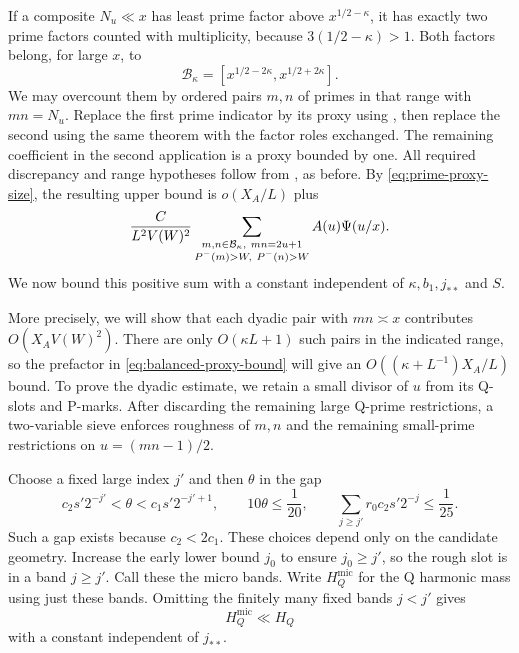 If a composite $N_u\ll x$ has least prime factor above
$x^{1/2-\kappa}$, it has exactly two prime factors counted with
multiplicity, because $3(1/2-\kappa)>1$. Both factors belong,
for large $x$, to
\[
 \mathcal B_\kappa=[x^{1/2-2\kappa},x^{1/2+2\kappa}].
\]
We may overcount them by ordered pairs $m,n$ of primes in that
range with $mn=N_u$. Replace the first prime indicator by its
proxy using , then replace the second using the
same theorem with the factor roles exchanged. The remaining
coefficient in the second application is a proxy bounded by one.
All required discrepancy and range hypotheses follow from
, as before. By
\eqref{eq:prime-proxy-size}, the resulting upper bound is
$o(X_A/L)$ plus
\begin{equation}\label{eq:balanced-proxy-bound}
 \frac{C}{L^2V(W)^2}
 \sum_{\substack{m,n\in\mathcal B_\kappa,\ mn=2u+1\\
                   P^{-}(m)>W,\ P^{-}(n)>W}}
                     A(u)\Psi(u/x).
\end{equation}
We now bound this positive sum with a constant independent of
$\kappa,b_1,j_{**}$ and $S$.

More precisely, we will show that each dyadic pair with $mn\asymp x$
contributes $O(X_AV(W)^2)$. There are only $O(\kappa L+1)$ such
pairs in the indicated range, so the prefactor in
\eqref{eq:balanced-proxy-bound} will give an
$O((\kappa+L^{-1})X_A/L)$ bound. To prove the dyadic estimate, we
retain a small divisor of $u$ from its Q-slots and P-marks. After
discarding the remaining large Q-prime restrictions, a two-variable
sieve enforces roughness of $m,n$ and the remaining small-prime
restrictions on $u=(mn-1)/2$.

Choose a fixed large index $j'$ and then $\theta$ in the gap
\begin{equation}\label{eq:micro-choice}
 c_2s'2^{-j'}<\theta<c_1s'2^{-j'+1},\qquad
 10\theta\le\frac1{20},\qquad
 \sum_{j\ge j'}r_0c_2s'2^{-j}\le\frac1{25}.
\end{equation}
Such a gap exists because $c_2<2c_1$. These choices depend only
on the candidate geometry. Increase the early lower bound $j_0$
to ensure $j_0\ge j'$, so the rough slot is in a band $j\ge j'$.
Call these the micro bands. Write $H_Q^{\mathrm{mic}}$ for the
Q harmonic mass using just these bands. Omitting the finitely
many fixed bands $j<j'$ gives
\begin{equation}\label{eq:micro-harmonic-comparison}
 H_Q^{\mathrm{mic}}\ll H_Q
\end{equation}
with a constant independent of $j_{**}$.

